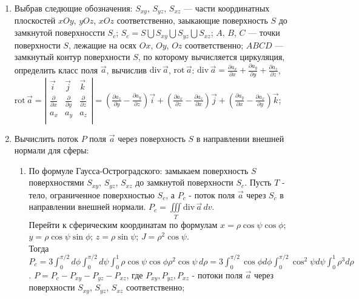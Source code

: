 \documentclass[14pt,a4paper,final]{extreport}
\begin{document}
\begin{enumerate}[label=\arabic*.]
	\item Выбрав следющие обозначения: \( S_{xy} \), \( S_{yz} \), \( S_{xz} \) --- части координатных плоскостей \( xOy \), \( yOz \), \( xOz \) соответственно, заыкающие поверхность \( S \) до замкнутой поверхноссти \( S_c \); \( S_c = S \bigcup S_{xy} \bigcup S_{yz} \bigcup S_{xz} \); \( A \), \( B \), \( C \) --- точки поверхности \( S \), лежащие на осях \( Ox \), \( Oy \), \( Oz \) соответственно; \( ABCD \) --- замкнутый контур поверхности \( S \), по которому вычисляется циркуляция,  определить класс поля \( \vec a \), вычислив  \( \mathrm{div} \, \vec a \),  \( \mathrm{rot} \, \vec a \):  \( \mathrm{div} \, \vec a = \frac{\partial a_x}{\partial x} + \frac{\partial a_y}{\partial y} + \frac{\partial a_z}{\partial z} \),
	\( \mathrm{rot} \, \vec a = \left| \begin{matrix}
		\vec i & \vec j & \vec k \\
		\frac{\partial}{\partial x} & \frac{\partial}{\partial y} & \frac{\partial}{\partial z} \\
		a_x & a_y & a_z \\
	\end{matrix} \right|
	= (\frac{\partial a_z}{\partial y} - \frac{\partial a_y}{\partial z})\vec i + (\frac{\partial a_x}{\partial z} - \frac{\partial a_z}{\partial x})\vec j + (\frac{\partial a_y}{\partial x} - \frac{\partial a_x}{\partial y})\vec k \);
	\item Вычислить поток \( P \) поля \( \vec a \) через поверхность \( S \) в направлении внешней нормали для сферы:
	\begin{enumerate}[label=\theenumi\arabic*]
		\item По формуле Гаусса-Остроградского: замыкаем поверхность \( S \)  поверхностями \( S_{xy} \), \( S_{yz} \), \( S_{xz} \) до замкнутой поверхности \( S_c \).
		Пусть  \( T \) - тело, ограниченное поверхностью  \( S_c \), а  \( P_c \) - поток поля \( \vec a \) через \( S_c \) в направлении внешней нормали.
		\( P_c = \iiint\limits_T \mathrm{div} \, \vec a\,dv \). 
		\bigskip
		\\Перейти к сферическим координатам по формулам \( x = \rho\cos\psi\cos\phi \); \( y = \rho\cos\psi\sin\phi \); \( z = \rho\sin\psi \); \( J = \rho^2\cos\psi \). 
		\bigskip
		\\Тогда \( P_c = 3\int_0^{\pi/2}{d\phi} \int_0^{\pi/2}{d\psi} \int_0^1{\rho\cos\psi\cos\phi\rho^2\cos\psi\,d\rho } = 3 \int_0^{\pi/2}\cos\phi d \phi \int_0^{\pi/2}\cos^2\psi d \psi \int_0^1\rho^3 d \rho \). \( P = P_c - P_{xy} - P_{yz} - P_{xz} \), где \( P_{xy}, P_{yz}, P_{xz} \) - потоки поля \( \vec a \) через поверхности \( S_{xy} \), \( S_{yz} \), \( S_{xz} \) соответственно;
		

\end{enumerate}
\end{enumerate}
\end{document}
